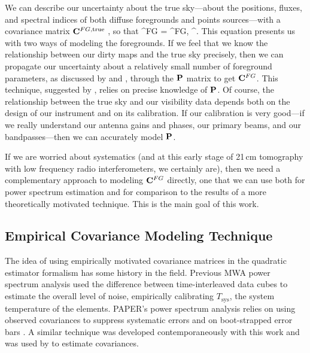 We can describe our uncertainty about the true sky---about the positions, fluxes, and spectral indices of both diffuse foregrounds and points sources---with a covariance matrix $\mathbf{C}^{FG,\text{true}}$ \cite{LT11,DillonFast}, so that
\beq
\CC^{FG} = \PSF \CC^{FG,} \PSF^\trans.
\eeq
This equation presents us with two ways of modeling the foregrounds. If we feel that we know the relationship between our dirty maps and the true sky precisely, then we can propagate our uncertainty about a relatively small number of foreground parameters, as discussed by \cite{LT11} and \cite{DillonFast}, through the $\mathbf{P}$ matrix to get $\mathbf{C}^{FG}$. This technique, suggested by \cite{dillonmapmaking}, relies on precise knowledge of $\mathbf{P}$. Of course, the relationship between the true sky and our visibility data depends both on the design of our instrument and on its calibration. If our calibration is very good---if we really understand our antenna gains and phases, our primary beams, and our bandpasses---then we can accurately model $\mathbf{P}$.

If we are worried about systematics (and at this early stage of 21\,cm tomography with low frequency radio interferometers, we certainly are), then we need a complementary approach to modeling $\mathbf{C}^{FG}$ directly, one that we can use both for power spectrum estimation and for comparison to the results of a more theoretically motivated technique. This is the main goal of this work.


\subsection{Empirical Covariance Modeling Technique} \label{sec:empirical}

The idea of using empirically motivated covariance matrices in the quadratic estimator formalism has some history in the field. Previous MWA power spectrum analysis \cite{X13} used the difference between time-interleaved data cubes to estimate the overall level of noise, empirically calibrating $T_\text{sys}$, the system temperature of the elements. PAPER's power spectrum analysis relies on using observed covariances to suppress systematic errors \cite{parsons14} and on boot-strapped error bars \cite{parsons14,DannyMultiRedshift}. A similar technique was developed contemporaneously with this work and was used by \cite{ali15} to estimate covariances.

